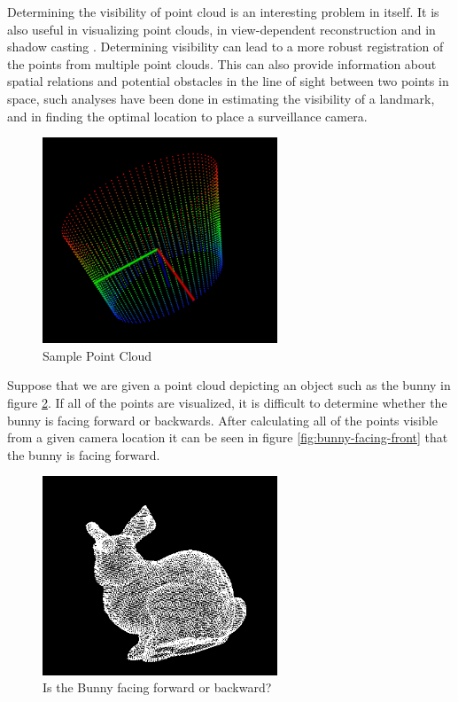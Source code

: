 \documentclass[11pt]{article}
\begin{document}
Determining the visibility of point cloud is an interesting problem in itself. It is also useful in visualizing point clouds, in view-dependent reconstruction and in shadow casting \cite{Katz07}. Determining visibility can lead to a more robust registration of the points from multiple point clouds. This can also provide information about spatial relations and potential obstacles in the line of sight between two points in space, such analyses have been done in estimating the visibility of a landmark, and in finding the optimal location to place a surveillance camera.

\pagebreak
\begin{figure}[h]
	\includegraphics[width=7cm]{simple-pcl}
	\centering
	\caption{Sample Point Cloud}
	\label{simple-point-cloud}
\end{figure}

Suppose that we are given a point cloud depicting an object such as the bunny in figure \ref{fig:bunny-facing-which-way}. If all of the points are visualized, it is difficult to determine whether the bunny is facing forward or backwards. After calculating all of the points visible from a given camera location it can be seen in figure \ref{fig:bunny-facing-front} that the bunny is facing forward.

\begin{figure}[h]
\includegraphics[width=7cm]{bunny-facing-which-way}
\centering
\caption{Is the Bunny facing forward or backward?}
\label{fig:bunny-facing-which-way}
\end{figure}
\end{document}
